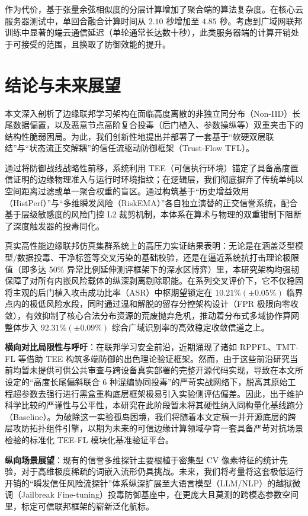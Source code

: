 \documentclass[11pt, a4paper, UTF8, fontset=fandol]{ctexart}
\begin{document}
作为代价，基于张量余弦相似度的分层计算增加了聚合端的算法复杂度。在核心云服务器测试中，单回合融合计算时间从 $2.10$ 秒增加至 $4.85$ 秒。考虑到广域网联邦训练中显著的端云通信延迟（单轮通常长达数十秒），此类服务器端的计算开销处于可接受的范围，且换取了防御效能的提升。

\section{结论与未来展望}
本文深入剖析了边缘联邦学习架构在面临高度离散的非独立同分布（Non-IID）长尾数据偏置，以及恶意节点高阶复合投毒（后门植入、参数操纵等）双重夹击下的结构性脆弱困局。为此，我们创新性地提出并部署了一套基于“软硬双层联结”与“状态流正交解耦”的信任流驱动防御框架（Trust-Flow TFL）。

通过将防御战线战略性前移，系统利用 TEE（可信执行环境）锚定了具备高度置信证明的边缘物理准入与运行时环境指纹；在逻辑层，我们彻底摒弃了传统单纯以空间距离过滤或单一聚合权重的盲区。通过构筑基于“历史增益效用（HistPerf）”与“多维瞬发风险（RiskEMA）”各自独立演替的正交信誉系统，配合基于层级敏感度的风险门控 L2 裁剪机制，本体系在算术与物理的双重钳制下阻断了深度触发器的投毒同化。

真实高性能边缘联邦仿真集群系统上的高压力实证结果表明：无论是在涵盖泛型模型/数据投毒、干净标签等交叉污染的基础校验，还是在逼近系统抗打击理论极限值（即多达 50\% 异常比例延伸测评框架下的深水区博弈）里，本研究架构均强韧保障了对所有内嵌风险载体的纵深剥离剔除职能。在系列交叉评价下，它不仅稳固将主观的后门植入攻击成功比率（ASR）中枢期望锁定在 $10.21\% (\pm 0.05\%)$ 临界点内的极低风险水段，同时通过温和解脱的留存分控架构设计（FPR 极限向零收敛），有效抑制了核心合法分布资源的荒废抛弃危机，推动着分布式多域协作算网整体步入 $92.31\% (\pm 0.09\%)$ 综合广域识别率的高效稳定收敛信道之上。

\textbf{横向对比局限性与呼吁}：在联邦学习安全前沿，近期涌现了诸如 RPPFL\cite{zhang2025rppfl}、TMT-FL\cite{lu2025tmt} 等借助 TEE 构筑多端防御的出色理论验证框架。然而，由于这些前沿研究当前均暂未提供可供公共审查与跨设备真实部署的完整开源代码实现，导致在本文所设定的“高度长尾偏斜联合 6 种混编协同投毒”的严苛实战网络下，脱离其原始工程超参数去强行进行黑盒重构底层框架极易引入实验侧评估偏差。因此，出于维护科学比较的严谨性与公平性，本研究在此阶段暂未将其硬性纳入同构量化基线跑分（Baseline）。为破除这一实验孤岛困境，我们将随着本文定稿一并开源底层的跨层攻防拓扑组件引擎，以期为未来的可信边缘计算领域孕育一套具备严苛对抗场景检验的标准化 TEE-FL 模块化基准验证平台。

\textbf{纵向场景展望}：现有的信誉多维探针主要根植于密集型 CV 像素特征的统计先验，对于高维极度稀疏的词嵌入流形仍具挑战。未来，我们将考量将这套极低运行开销的“瞬发信任风险流探针”体系纵深扩展至大语言模型（LLM/NLP）的越狱微调（Jailbreak Fine-tuning）投毒防御基座中，在更庞大且莫测的跨模态参数空间里，标定可信联邦框架的崭新泛化航标。
\end{document}

